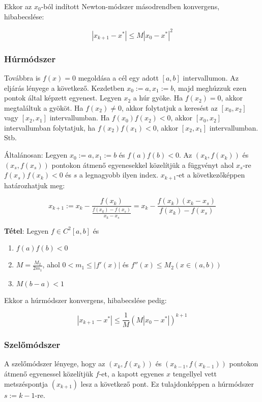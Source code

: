 \documentclass[margin=0px]{article}
\begin{document}
\noindent Ekkor az $x_{0}$-ból indított Newton-módszer másodrendben konvergens, hibabecslése:

\begin{displaymath}
    |x_{k+1} - x^{*}| \leq M|x_{0} - x^{*}|^{2}
\end{displaymath}
\subsubsection{Húrmódszer}

Továbbra is $f(x) = 0$ megoldása a cél egy adott $[a, b]$ intervallumon.
Az eljárás lényege a következő. Kezdetben $x_{0} := a, x_{1} := b$, majd meghúzzuk ezen pontok által
képzett egyenest. Legyen $x_{2}$ a húr gyöke. Ha $f(x_{2}) = 0$, akkor megtaláltuk a gyököt. Ha $f(x_{2}) \not = 0$,
akkor folytatjuk a keresést az $[x_{0},x_{2}]$ vagy $[x_{2},x_{1}]$ intervallumban. Ha $f(x_{0})f(x_{2}) < 0$, akkor
$[x_{0},x_{2}]$ intervallumban folytatjuk, ha $f(x_{2}) f(x_{1}) < 0$, akkor $[x_{2}, x_{1}]$ intervallumban. Stb.

Általánosan: Legyen $x_{0} := a, x_{1} := b$ és	$f(a)f(b) < 0$. Az $(x_{k},f(x_{k}))$ és $(x_{s},f(x_{s}))$
pontokon átmenő egyenesekkel közelítjük a függvényt	ahol $x_{s}$-re $f(x_{s})f(x_{k})<0$ és $s$ a legnagyobb ilyen index.
$x_{k+1}$-et a következőképpen határozhatjuk meg:

\begin{displaymath}
    x_{k+1} := x_{k} -
    \frac
    {f(x_{k})}
    {\frac{f(x_{k}) - f(x_{s})}{x_{k}-x_{s}}} =
    x_{k} -
    \frac
    {f(x_{k}) (x_{k} -x_{s}) }
    {f(x_{k}) - f(x_{s})}
\end{displaymath}

\noindent \textbf{Tétel}: Legyen $f \in C^{2}[a,b]$ és
\begin{enumerate}
    \item	$f(a)f(b)<0$
    \item	$M = \frac{M_{2}}{2m_{1}}$, ahol $0<m_{1} \leq |f'(x)|$ és $f''(x) \leq M_{2} (x \in (a,b))$
    \item	$M(b-a) < 1$
\end{enumerate}

\noindent Ekkor a húrmódszer konvergens, hibabecslése pedig:

\begin{displaymath}
    |x_{k+1} - x^{*}| \leq \frac{1}{M}(M|x_{0}-x^{*}|)^{k+1}
\end{displaymath}

\subsubsection{Szelőmódszer}
A szelőmódszer lényege, hogy az $(x_{k},f(x_{k}))$ és $(x_{k-1},f(x_{k-1}))$ pontokon átmenő egyenessel közelítjük
$f$-et, a kapott egyenes $x$ tengellyel vett metszéspontja $(x_{k+1})$ lesz a következő pont. Ez
tulajdonképpen a húrmódszer $s := k - 1$-re.
\end{document}
